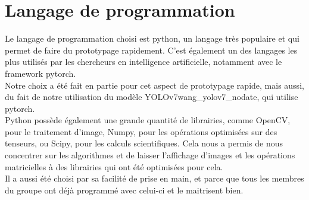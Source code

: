 \section{Langage de programmation}
Le langage de programmation choisi est python, un langage très populaire et qui permet de faire du prototypage rapidement. C'est également un des langages les plus utilisés par les chercheurs en intelligence artificielle, notamment avec le framework pytorch.\\
Notre choix a été fait en partie pour cet aspect de prototypage rapide, mais aussi, du fait de notre utilisation du modèle YOLOv7{wang_yolov7_nodate}, qui utilise pytorch.\\
Python possède également une grande quantité de librairies, comme OpenCV, pour le traitement d'image, Numpy, pour les opérations optimisées sur des tenseurs, ou Scipy, pour les calculs scientifiques. Cela nous a permis de nous concentrer sur les algorithmes et de laisser l'affichage d'images et les opérations matricielles à des librairies qui ont été optimisées pour cela.\\
Il a aussi été choisi par sa facilité de prise en main, et parce que tous les membres du groupe ont déjà programmé avec celui-ci et le maitrisent bien.


\clearpage
